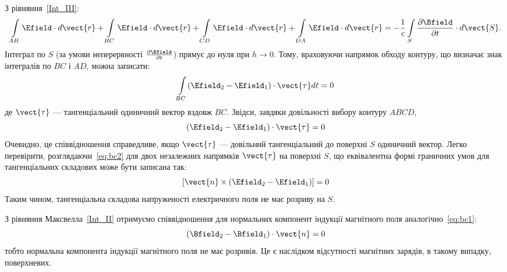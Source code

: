 З рівняння~\eqref{Int_III}:
\begin{equation*}
	\int\limits_{AB} \Efield\cdot d\vect{r} + \int\limits_{BC} \Efield\cdot d\vect{r} + \int\limits_{CD} \Efield\cdot d\vect{r} + \int\limits_{DA}
	\Efield\cdot d\vect{r} =
	-\frac1c \int\limits_S \frac{\partial\Bfield}{\partial t}\cdot d\vect{S}.
\end{equation*}
Інтеграл по $S$ (за умови неперервності $\frac{\partial\Bfield}{\partial t}$) прямує до нуля при $h\to0$. Тому,
враховуючи напрямок обходу контуру, що визначає знак інтегралів по $BC$ і $AD$, можна записати:
\begin{equation*}
	\int\limits_{BC} (\Efield_2 - \Efield_1)\cdot\vect{\tau} d\ell = 0
\end{equation*}
де $\vect{\tau}$ --- тангенціальний одиничний вектор вздовж $BC$. Звідси, завдяки довільності вибору контуру $ABCD$,
\begin{equation}\label{eq:bc2}
	(\Efield_2 - \Efield_1)\cdot\vect{\tau} = 0
\end{equation}
Очевидно, це співвідношення справедливе, якщо $\vect{\tau}$ --- довільний тангенціальний до поверхні $S$ одиничний
вектор. Легко перевірити, розглядаючи~\eqref{eq:bc2} для двох незалежних напрямків $\vect{\tau}$ на поверхні $S$, що
еквівалентна формі граничних умов для тангенціальних складових може бути записана так:
\begin{equation*}
	\left[ \vect{n}\times (\Efield_2 - \Efield_1)\right] = 0
\end{equation*}
Таким чином, тангенціальна складова напруженості електричного поля не має розриву на $S$.

З рівняння Максвелла~\eqref{Int_II} отримуємо співвідношення для нормальних компонент індукції магнітного поля
аналогічно~\eqref{eq:bc1}:
\begin{equation}
	(\Bfield_2 - \Bfield_1)\cdot\vect{n} = 0
\end{equation}
тобто нормальна компонента індукції магнітного поля не має розривів. Це є наслідком відсутності магнітних зарядів, в
такому випадку, поверхневих.

